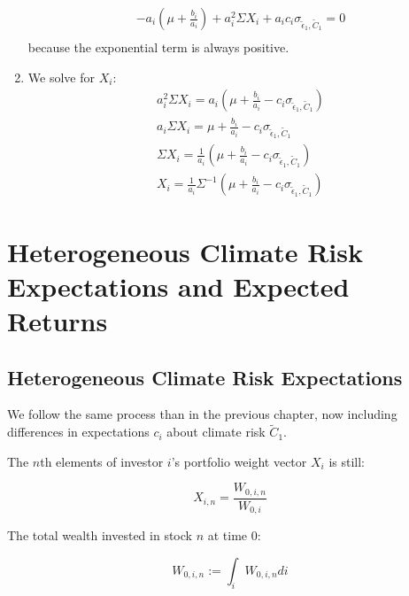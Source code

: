 \begin{enumerate}
\begin{equation}
\begin{aligned}
            -a_i(\mu + \frac{b_i}{a_i}) + a_i^2 \Sigma X_i + a_i c_i \sigma_{\tilde{\epsilon}_1, \tilde{C}_1} = 0 \\
        \end{aligned}
    \end{equation}
    because the exponential term is always positive.
    \item We solve for $X_i$:
    \begin{equation}
        \begin{aligned}
            a_i^2 \Sigma X_i = a_i(\mu + \frac{b_i}{a_i} - c_i \sigma_{\tilde{\epsilon}_1, \tilde{C}_1}) \\
            a_i \Sigma X_i = \mu + \frac{b_i}{a_i} - c_i \sigma_{\tilde{\epsilon}_1, \tilde{C}_1} \\
            \Sigma X_i = \frac{1}{a_i}( \mu + \frac{b_i}{a_i} - c_i \sigma_{\tilde{\epsilon}_1, \tilde{C}_1}) \\
            X_i = \frac{1}{a_i}\Sigma^{-1} ( \mu + \frac{b_i}{a_i} - c_i \sigma_{\tilde{\epsilon}_1, \tilde{C}_1})
        \end{aligned}
    \end{equation}
\end{enumerate}


\section{Heterogeneous Climate Risk Expectations and Expected Returns}


\subsection{Heterogeneous Climate Risk Expectations}

We follow the same process than in the previous 
chapter, now including differences in expectations
$c_i$ 
about climate risk $\tilde{C}_1$.

The $n$th elements of investor $i$'s portfolio weight 
vector $X_i$ is still:

\begin{equation}
    X_{i,n} =  \frac{W_{0,i,n}}{W_{0,i}}
\end{equation}

The total wealth invested in stock $n$ at time 0:


\begin{equation}
    W_{0,i,n} := \int_i W_{0,i,n} di 
\end{equation}

